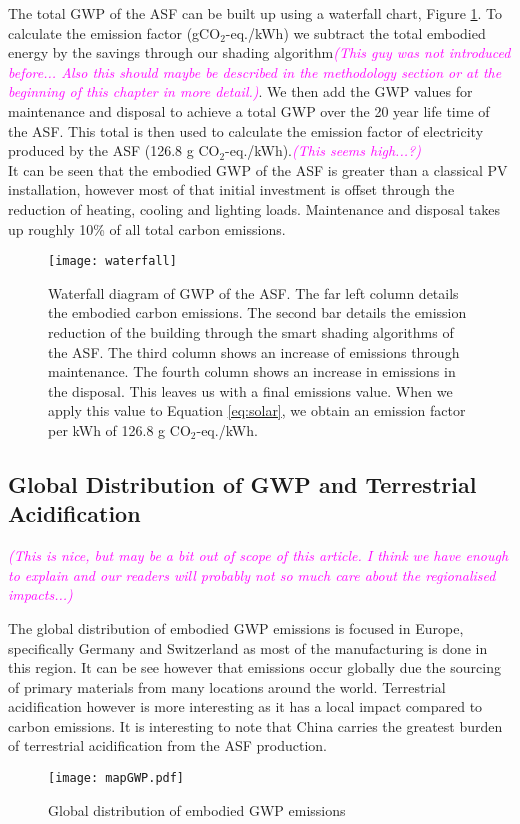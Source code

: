 The total GWP of the ASF can be built up using a waterfall chart, Figure \ref{fig:waterfall}. To calculate the emission factor (gCO$_2$-eq./kWh) we subtract the total embodied energy by the savings through our shading algorithm\textcolor{magenta}{\textit{(This guy was not introduced before... Also this should maybe be described in the methodology section or at the beginning of this chapter in more detail.)}}. We then add the GWP values for maintenance and disposal to achieve a total GWP over the 20 year life time of the ASF. This total is then used to calculate the emission factor of electricity produced by the ASF (126.8 g CO$_2$-eq./kWh).\textcolor{magenta}{\textit{(This seems high...?)}}\\

It can be seen that the embodied GWP of the ASF is greater than a classical PV installation, however most of that initial investment is offset through the reduction of heating, cooling and lighting loads. Maintenance and disposal takes up roughly 10\% of all total carbon emissions.


\begin{figure}[H]
\begin{center}
\texttt{[image: waterfall]}
\caption{Waterfall diagram of GWP of the ASF. The far left column details the embodied carbon emissions. The second bar details the emission reduction of the building through the smart shading algorithms of the ASF. The third column shows an increase of emissions through maintenance. The fourth column shows an increase in emissions in the disposal. This leaves us with a final emissions value. When we apply this value to Equation \ref{eq:solar}, we obtain an emission factor per kWh of 126.8 g CO$_2$-eq./kWh.}
\label{fig:waterfall}
\end{center}
\end{figure}

\subsection{Global Distribution of GWP and Terrestrial Acidification}
\textcolor{magenta}{\textit{(This is nice, but may be a bit out of scope of this article. I think we have enough to explain and our readers will probably not so much care about the regionalised impacts...)}}

The global distribution of embodied GWP emissions is focused in Europe, specifically Germany and Switzerland as most of the manufacturing is done in this region. It can be see however that emissions occur globally due the sourcing of primary materials from many locations around the world. Terrestrial acidification however is more interesting as it has a local impact compared to carbon emissions. It is interesting to note that China carries the greatest burden of terrestrial acidification from the ASF production. 
\begin{figure}[H]
\begin{center}
\texttt{[image: mapGWP.pdf]}
\caption{Global distribution of embodied GWP emissions}
\label{fig:mapGWP}
\end{center}
\end{figure}

